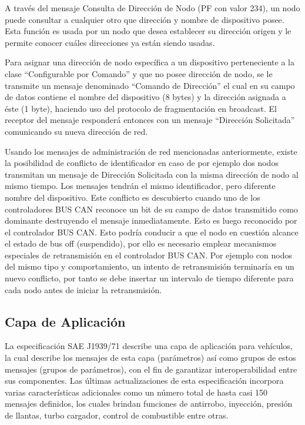 A través del mensaje Consulta de Dirección de Nodo (PF con valor 234), un nodo puede consultar a cualquier otro que dirección y nombre de dispositivo posee. Esta función es usada por un nodo que desea establecer su dirección origen y le permite conocer cuáles direcciones ya están siendo usadas. 

Para asignar una dirección de nodo específica a un dispositivo perteneciente a la clase “Configurable por Comando” y que no posee dirección de nodo, se le transmite un mensaje denominado “Comando de Dirección” el cual en su campo de datos contiene el nombre del dispositivo (8 bytes) y la dirección asignada a éste (1 byte), haciendo uso del protocolo de fragmentación en broadcast. El receptor del mensaje responderá entonces con un mensaje “Dirección Solicitada” comunicando su nueva dirección de red.

Usando los mensajes de administración de red mencionadas anteriormente, existe la posibilidad de conflicto de identificador en caso de por ejemplo  dos nodos transmitan un mensaje de Dirección Solicitada con la misma dirección de nodo al mismo tiempo. Los mensajes tendrán el mismo identificador, pero diferente nombre del dispositivo. Este conflicto es descubierto cuando uno de los controladores BUS CAN reconoce un bit de su campo de datos transmitido como dominante destruyendo el mensaje inmediatamente. Esto es luego reconocido por el controlador BUS CAN. Esto podría conducir a que el nodo en cuestión alcance el estado de bus off (suspendido), por ello es necesario emplear mecanismos especiales de retransmisión en el controlador BUS CAN. Por ejemplo con nodos del mismo tipo y comportamiento, un intento de retransmisión terminaría en un nuevo conflicto, por tanto se debe insertar un intervalo de tiempo diferente para cada nodo antes de iniciar la retransmisión.

\subsection {Capa de Aplicación}

La especificación SAE J1939/71 describe una capa de aplicación para vehículos, la cual describe los mensajes de esta capa (parámetros) así como grupos de estos mensajes (grupos de parámetros), con el fin de garantizar interoperabilidad entre sus componentes.
Las últimas actualizaciones de esta especificación incorpora varias características adicionales como un número total de hasta casi 150 mensajes definidos, los cuales brindan funciones de antirrobo, inyección, presión de llantas, turbo cargador, control de combustible entre otras.

